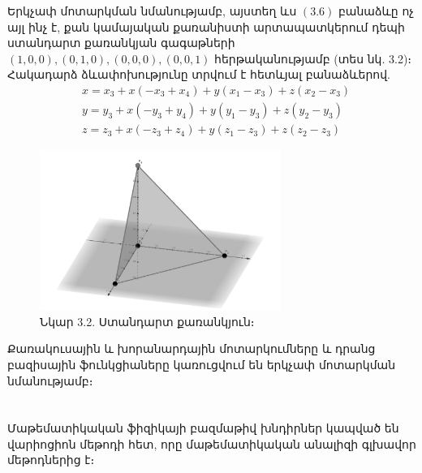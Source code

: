 \documentclass[fleqn, bachelor,subf,12pt,notitlepage]{article}
\begin{document}
Երկչափ մոտարկման նմանությամբ, այստեղ ևս $(3.6)$ բանաձևը ոչ այլ ինչ է, քան կամայական քառանիստի արտապատկերում դեպի ստանդարտ քառանկյան գագաթների $(1, 0, 0), (0, 1, 0), (0, 0, 0), (0, 0, 1)$ հերթականությամբ (տես նկ. 3.2)։ Հակադարձ ձևափոխությունը տրվում է հետևյալ բանաձևերով.
\begin{equation}
\begin{aligned}
				&x = x_{3} + x \left(- x_{3} + x_{4}\right) + y \left(x_{1} - x_{3}\right) + z \left(x_{2} - x_{3}\right) \\
				&y = y_{3} + x \left(- y_{3} + y_{4}\right) + y \left(y_{1} - y_{3}\right) + z \left(y_{2} - y_{3}\right) \\
				&z = z_{3} + x \left(- z_{3} + z_{4}\right) + y \left(z_{1} - z_{3}\right) + z \left(z_{2} - z_{3}\right)
\end{aligned}
\end{equation}
\begin{figure}[H]
\centering
\includegraphics[width=0.7\textwidth]{images/tetrahedron}
\captionsetup{labelformat=empty}
\caption{Նկար 3.2. Ստանդարտ քառանկյուն։}
\end{figure}


Քառակուսային և խորանարդային մոտարկումները և դրանց բազիսային ֆունկցիաները կառուցվում են երկչափ մոտարկման նմանությամբ։
\newpage
\section*{}
\setcounter{equation}{0}

Մաթեմատիկական ֆիզիկայի բազմաթիվ խնդիրներ կապված են վարիոցիոն մեթոդի հետ, որը մաթեմատիկական անալիզի գլխավոր մեթոդներից է։
\end{document}
